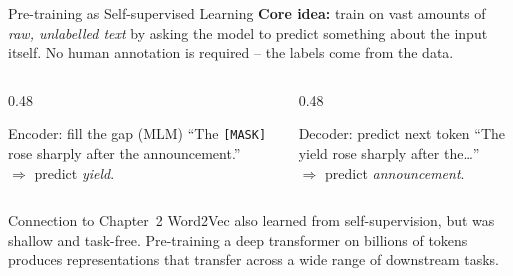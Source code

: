 \documentclass[11pt,aspectratio=169,professionalfonts]{beamer}
\begin{document}
%
%
\begin{frame}{Pre-training as Self-supervised Learning}
  \textbf{Core idea:} train on vast amounts of \emph{raw, unlabelled text}
  by asking the model to predict something about the input itself.
  No human annotation is required -- the labels come from the data.
  \medskip

  \begin{columns}[T]
    \begin{column}{0.48\linewidth}
      \begin{exampleblock}{Encoder: fill the gap (MLM)}
        ``The \texttt{[MASK]} rose sharply after the announcement.''\\
        $\Rightarrow$ predict \emph{yield}.
      \end{exampleblock}
    \end{column}
    \begin{column}{0.48\linewidth}
      \begin{exampleblock}{Decoder: predict next token}
        ``The yield rose sharply after the\ldots''\\
        $\Rightarrow$ predict \emph{announcement}.
      \end{exampleblock}
    \end{column}
  \end{columns}
  \vspace{0.5em}
  \begin{block}{Connection to Chapter~2}
    Word2Vec also learned from self-supervision, but was shallow and task-free.
    Pre-training a deep transformer on billions of tokens produces
    representations that transfer across a wide range of downstream tasks.
  \end{block}
\end{frame}
%
%
\end{document}
